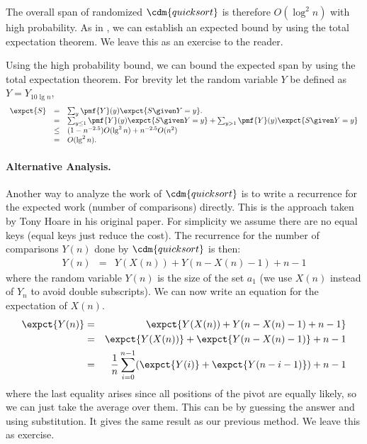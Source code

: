 {The overall span of randomized $\cdm{\qsort{}}$ is therefore $O(\log^2 n)$
with high probability.
%
As in , we can establish an expected bound by using the
total expectation theorem.
%
We leave this as an exercise to the reader.

\begin{notesonly}
Using the high probability bound, we can bound the expected span by
using the total expectation theorem.
%
For brevity let the random variable $Y$ be defined as $Y = Y_{10\lg n}$,
%
\[
\begin{array}{lll}
\expct{S} & = & \sum_{y}\pmf{Y}(y) \expct{S \given Y = y}.
\\
& = & 
\sum_{y \le 1}{\pmf{Y}(y) \expct{S \given Y = y}}
 + 
\sum_{y >1}{\pmf{Y}(y) \expct{S \given Y = y}}
\\
& \le & 
(1 - n^{-2.5}) O(\lg^2{n}) 
 + 
n^{-2.5} O(n^2)
\\
& = &
O(\lg^2{n}). 
\end{array}
\]

\end{notesonly}

\paragraph{Alternative Analysis.}

Another way to analyze the work of $\cdm{\qsort{}}$ is to write a recurrence
for the expected work (number of comparisons) directly.  This is the
approach taken by Tony Hoare in his original paper.  For simplicity we
assume there are no equal keys (equal keys just reduce the cost).  The
recurrence for the number of comparisons $Y(n)$ done by $\cdm{\qsort{}}$ is
then:
\begin{eqnarray*}
Y(n) & = & Y(X(n)) + Y(n-X(n)-1) + n -1
\end{eqnarray*}
where the random variable $Y(n)$ is the size of the set $a_1$ (we
use $X(n)$ instead of $Y_n$ to avoid double subscripts).  We can now write
an equation for the expectation of $X(n)$.
\begin{eqnarray*}
\expct{Y(n)} & = & \expct{Y(X(n)) + Y(n-X(n)-1) + n -1}\\
             & = & \expct{Y(X(n))} + \expct{Y(n-X(n)-1)} + n -1\\
             & = & \frac{1}{n} \sum_{i=0}^{n-1}(\expct{Y(i)} + \expct{Y(n-i-1)}) + n -1
\end{eqnarray*}
where the last equality arises since all positions of the pivot are
equally likely, so we can just take the average over them.  
%
This can be by guessing the answer and using substitution.  It gives
the same result as our previous method.  We leave this as exercise.


}
